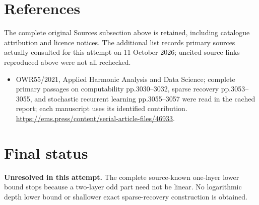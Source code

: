 \documentclass[11pt]{article}
\begin{document}
\section{References}
The complete original Sources subsection above is retained, including catalogue attribution and licence notices. The additional list records primary sources actually consulted for this attempt on 11 October 2026; uncited source links reproduced above were not all rechecked.
\begin{itemize}
\item OWR55/2021, Applied Harmonic Analysis and Data Science; complete primary passages on computability pp.3030–3032, sparse recovery pp.3053–3055, and stochastic recurrent learning pp.3055–3057 were read in the cached report; each manuscript uses its identified contribution. \url{https://ems.press/content/serial-article-files/46933}.
\end{itemize}
\section{Final status}
\textbf{Unresolved in this attempt.} The complete source-known one-layer lower bound stops because a two-layer odd part need not be linear. No logarithmic depth lower bound or shallower exact sparse-recovery construction is obtained.
\end{document}
